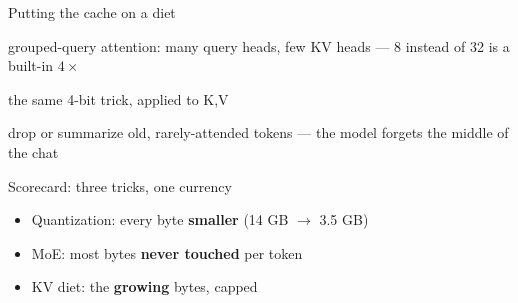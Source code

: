 \begin{frame}{Putting the cache on a diet}
  \vspace{0.6em}
  \raggedright
  \begin{description}[<+->][Quantize it]\itemsep7pt
    \item[Share it] grouped-query attention: many query heads, few KV heads
      --- 8 instead of 32 is a built-in $4\times$
    \item[Quantize it] the same 4-bit trick, applied to K,V
    \item[Evict] drop or summarize old, rarely-attended tokens ---
      the model forgets the middle of the chat
  \end{description}

  \vspace{0.8em}
\end{frame}

\begin{frame}{Scorecard: three tricks, one currency}
  \vspace{0.7em}
  \raggedright
  \begin{itemize}\itemsep7pt
    \item Quantization: every byte \textbf{smaller} (14 GB $\rightarrow$ 3.5 GB)
    \item MoE: most bytes \textbf{never touched} per token
    \item KV diet: the \textbf{growing} bytes, capped
  \end{itemize}

  \vspace{0.9em}
\end{frame}
